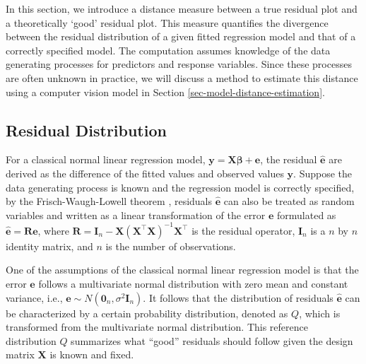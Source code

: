 \documentclass[]{interact}
\theoremstyle{plain}%
\theoremstyle{definition}
\theoremstyle{remark}
\begin{document}
In this section, we introduce a distance measure between a true residual
plot and a theoretically `good' residual plot. This measure quantifies
the divergence between the residual distribution of a given fitted
regression model and that of a correctly specified model. The
computation assumes knowledge of the data generating processes for
predictors and response variables. Since these processes are often
unknown in practice, we will discuss a method to estimate this distance
using a computer vision model in Section
\ref{sec-model-distance-estimation}.

\subsection{Residual Distribution}\label{residual-distribution}

For a classical normal linear regression model,
\(\boldsymbol{y} = \boldsymbol{X}\boldsymbol{\beta} + \boldsymbol{e}\),
the residual \(\hat{\boldsymbol{e}}\) are derived as the difference of
the fitted values and observed values \(\boldsymbol{y}\). Suppose the
data generating process is known and the regression model is correctly
specified, by the Frisch-Waugh-Lowell theorem \citep{frisch1933partial},
residuals \(\hat{\boldsymbol{e}}\) can also be treated as random
variables and written as a linear transformation of the error
\(\boldsymbol{e}\) formulated as
\(\hat{\boldsymbol{e}} = \boldsymbol{R}\boldsymbol{e}\), where
\(\boldsymbol{R}=\boldsymbol{I}_n -\boldsymbol{X}(\boldsymbol{X}^\top\boldsymbol{X})^{-1}\boldsymbol{X}^\top\)
is the residual operator, \(\boldsymbol{I}_n\) is a \(n\) by \(n\)
identity matrix, and \(n\) is the number of observations.

One of the assumptions of the classical normal linear regression model
is that the error \(\boldsymbol{e}\) follows a multivariate normal
distribution with zero mean and constant variance, i.e.,
\(\boldsymbol{e} \sim N(\boldsymbol{0}_n,\sigma^2\boldsymbol{I}_n)\). It
follows that the distribution of residuals \(\hat{\boldsymbol{e}}\) can
be characterized by a certain probability distribution, denoted as
\(Q\), which is transformed from the multivariate normal distribution.
This reference distribution \(Q\) summarizes what ``good'' residuals
should follow given the design matrix \(\boldsymbol{X}\) is known and
fixed.
\end{document}
